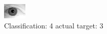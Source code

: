\begin{figure}[h!]
\begin{center}
\includegraphics[width=0.60\columnwidth]{figures/ID2060_class_4_target_3.png}
\end{center}
\caption{ Classification: 4 actual target: 3}
\label{fig:ID2060_class_4_target_3}
\end{figure}
